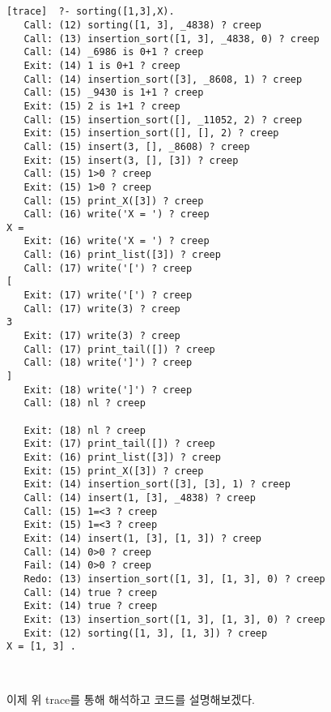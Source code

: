 \documentclass{article}
\begin{document}
\begin{lstlisting}


[trace]  ?- sorting([1,3],X).
   Call: (12) sorting([1, 3], _4838) ? creep
   Call: (13) insertion_sort([1, 3], _4838, 0) ? creep
   Call: (14) _6986 is 0+1 ? creep
   Exit: (14) 1 is 0+1 ? creep
   Call: (14) insertion_sort([3], _8608, 1) ? creep
   Call: (15) _9430 is 1+1 ? creep
   Exit: (15) 2 is 1+1 ? creep
   Call: (15) insertion_sort([], _11052, 2) ? creep
   Exit: (15) insertion_sort([], [], 2) ? creep
   Call: (15) insert(3, [], _8608) ? creep
   Exit: (15) insert(3, [], [3]) ? creep
   Call: (15) 1>0 ? creep
   Exit: (15) 1>0 ? creep
   Call: (15) print_X([3]) ? creep
   Call: (16) write('X = ') ? creep
X =
   Exit: (16) write('X = ') ? creep
   Call: (16) print_list([3]) ? creep
   Call: (17) write('[') ? creep
[
   Exit: (17) write('[') ? creep
   Call: (17) write(3) ? creep
3
   Exit: (17) write(3) ? creep
   Call: (17) print_tail([]) ? creep
   Call: (18) write(']') ? creep
]
   Exit: (18) write(']') ? creep
   Call: (18) nl ? creep

   Exit: (18) nl ? creep
   Exit: (17) print_tail([]) ? creep
   Exit: (16) print_list([3]) ? creep
   Exit: (15) print_X([3]) ? creep
   Exit: (14) insertion_sort([3], [3], 1) ? creep
   Call: (14) insert(1, [3], _4838) ? creep
   Call: (15) 1=<3 ? creep
   Exit: (15) 1=<3 ? creep
   Exit: (14) insert(1, [3], [1, 3]) ? creep
   Call: (14) 0>0 ? creep
   Fail: (14) 0>0 ? creep
   Redo: (13) insertion_sort([1, 3], [1, 3], 0) ? creep
   Call: (14) true ? creep
   Exit: (14) true ? creep
   Exit: (13) insertion_sort([1, 3], [1, 3], 0) ? creep
   Exit: (12) sorting([1, 3], [1, 3]) ? creep
X = [1, 3] .



\end{lstlisting}



이제 위 trace를 통해 해석하고 코드를 설명해보겠다.
\\ \\
\end{document}

